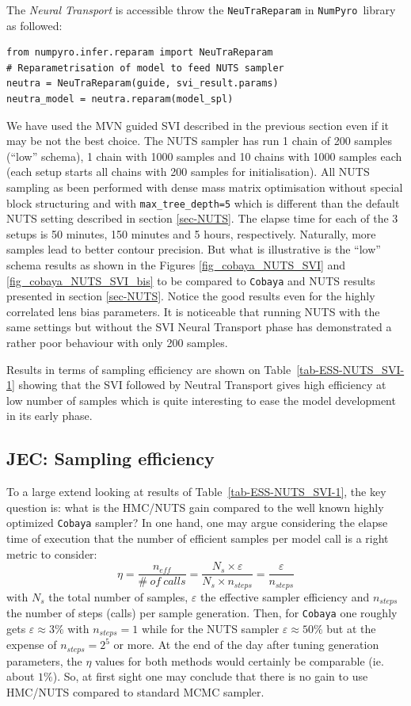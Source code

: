 \documentclass[twocolumn,twocolappendix,nofootinbib,iop]{openjournal}
\newcommand{\JEC}[1]{{\color{magenta}JEC: #1}}
\newcommand{\numpyro}{\texttt{NumPyro}}
\begin{document}
The \textit{Neural Transport} is accessible throw the  \verb|NeuTraReparam| in \numpyro\ library as followed:
\begin{lstlisting}[language=iPython]
from numpyro.infer.reparam import NeuTraReparam
# Reparametrisation of model to feed NUTS sampler
neutra = NeuTraReparam(guide, svi_result.params)
neutra_model = neutra.reparam(model_spl) 
\end{lstlisting}
%
We have used the MVN guided SVI described in the previous section even if it may be not the best choice. The NUTS sampler has run 1 chain of 200 samples (``low'' schema), 1 chain with 1000 samples and 10 chains  with 1000 samples each (each setup starts all chains with 200 samples for initialisation). All NUTS sampling as been performed with dense mass matrix optimisation without special block structuring and with \texttt{max\_tree\_depth=5} which is different than the default NUTS setting described in section \ref{sec-NUTS}. The elapse time for each of the 3 setups is 50 minutes, 150 minutes and 5 hours, respectively. Naturally, more samples lead to better contour precision. But what is illustrative is the ``low'' schema results as shown in the Figures \ref{fig_cobaya_NUTS_SVI} and \ref{fig_cobaya_NUTS_SVI_bis}  to be compared to \texttt{Cobaya} and NUTS results presented in section \ref{sec-NUTS}. Notice the good results even for the highly correlated lens bias parameters. It is noticeable that running NUTS with the same settings  but without the SVI Neural Transport phase has demonstrated a rather poor behaviour with only 200 samples.  

Results in terms of sampling efficiency are shown on Table~\ref{tab-ESS-NUTS_SVI-1} showing that the SVI followed by Neutral Transport gives high efficiency at low number of samples which is quite interesting to ease the model development in its early phase.
%
\subsection{\JEC{Sampling efficiency}}
\label{sec-results}
%
To a large extend looking at results of Table~\ref{tab-ESS-NUTS_SVI-1}, the key question is: what is the HMC/NUTS gain compared to the well known highly optimized \texttt{Cobaya} sampler? 
In one hand, one may argue considering the elapse time of execution that the number of efficient samples per model call is a right metric to consider: 
\begin{equation}
    \eta = \frac{n_{eff}}{\#\ of\ calls} = \frac{N_s \times \varepsilon}{N_s \times n_{steps}} = \frac{\varepsilon}{n_{steps}}
\end{equation}
with $N_s$ the total number of samples, $\varepsilon$ the effective sampler efficiency  and $n_{steps}$ the number of steps (calls) per sample generation. Then, for \texttt{Cobaya} one roughly gets $\varepsilon\approx 3\%$ with $n_{steps}=1$ while for the NUTS sampler $\varepsilon\approx 50\%$ but at the expense of $n_{steps}=2^5$ or more. At the end of the day after tuning generation parameters, the $\eta$ values for both methods would certainly be comparable (ie. about $1\%$). So, at first sight one may conclude that there is no gain to use HMC/NUTS compared to standard MCMC sampler.  
\end{document}

